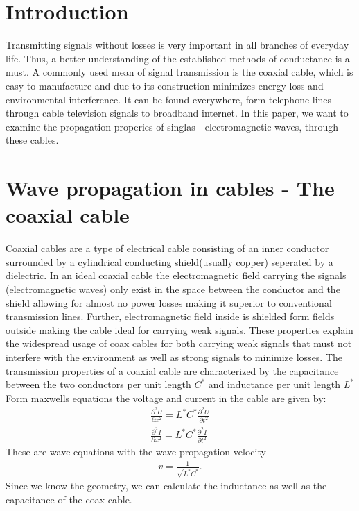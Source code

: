 \documentclass[a4paper,10pt,twocolumn]{article}
\begin{document}
    \section{Introduction}\label{sec:introduction}
    Transmitting signals without losses is very important in all branches of everyday life.
    Thus, a better understanding of the established methods of conductance is a must.
    A commonly used mean of signal transmission is the coaxial cable, which is easy to manufacture and due to its construction minimizes energy loss and environmental interference.
    It can be found everywhere, form telephone lines through cable television signals to broadband internet.
    In this paper, we want to examine the propagation properies of singlas - electromagnetic waves, through these cables.
    \section{Wave propagation in cables - The coaxial cable}
    Coaxial cables are a type of electrical cable consisting of an inner conductor surrounded by a cylindrical conducting shield(usually copper) seperated by a dielectric. In an ideal coaxial
    cable the electromagnetic field carrying the signals (electromagnetic waves) only exist in the space between the conductor and the shield allowing for almost no power losses making it superior to conventional
    transmission lines. 
    Further, electromagnetic field inside is shielded form fields outside making the cable ideal for carrying weak signals.
    These properties explain the widespread usage of coax cables for both carrying weak signals that must not interfere with the environment as well as strong signals to minimize losses.
    The transmission properties of a coaxial cable are characterized by the capacitance between the two conductors per unit length $C^*$ and inductance per unit length $L^*$
    Form maxwells equations the voltage and current in the cable are given by:
    \begin{align*}
        \frac{\partial^2U}{\partial x^2}=L^*C^*\frac{\partial^2U}{\partial t^2}\\
        \frac{\partial^2I}{\partial x^2}=L^*C^*\frac{\partial^2I}{\partial t^2}
    \end{align*}
    These are wave equations with the wave propagation velocity
    \begin{align}
        \label{coaxial:vel}
        v = \frac{1}{\sqrt{L^*C^*}}.
    \end{align}
    Since we know the geometry, we can calculate the inductance as well as the capacitance of the coax cable.
\end{document}
